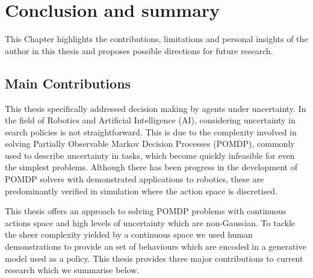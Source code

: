 \chapter{Conclusion and summary}

This Chapter highlights the contributions, limitations and personal insights of the author in this thesis and 
proposes possible directions for future research.





\section{Main Contributions}

This thesis specifically addressed decision making by agents under uncertainty. 
In the field of Robotics and Artificial Intelligence (AI), considering uncertainty in search policies is not straightforward. 
This is due to the complexity involved in solving Partially Observable Markov Decision Processes (POMDP), 
commonly used to describe uncertainty in tasks, which become quickly infeasible for even the simplest problems. 
Although there has been progress in the development of POMDP solvers with demonstrated applications to robotics, 
these are predominantly verified in simulation where the action space is discretised.  

This thesis offers an approach to solving POMDP problems with continuous actions space and high levels of uncertainty which 
are non-Gaussian. To tackle the sheer complexity yielded by a continuous space we used human demonstrations to provide an 
set of behaviours which are encoded in a generative model used as a policy. This thesis provides three major contributions to 
current research which we summarise below.

